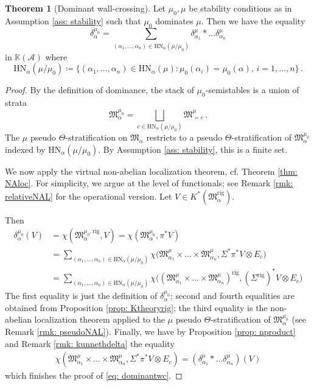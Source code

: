 \documentclass[12pt]{amsart}
\theoremstyle{definition}
\newtheorem{theorem}[definition]{Theorem}
\newcommand{\BK}{{\mathbb{K}}}
\newcommand{\CA}{{\mathcal A}}
\newcommand{\1}{\mathbf 1}
\newcommand{\FM}{{\mathfrak{M}}}
\newcommand{\rig}{\mathrm{rig}}
\newcommand{\HN}{\mathrm{HN}}
\begin{document}
\begin{theorem}[Dominant wall-crossing]\label{thm: dominantwc}
    Let $\mu_0, \mu$ be stability conditions as in Assumption \ref{ass: stability} such that $\mu_0$ dominates $\mu$. Then we have the equality
    \begin{equation}
        \label{eq: dominantwc}
    \delta_\alpha^{\mu_0}=\sum_{(\alpha_1, \ldots, \alpha_n)\in \HN_\alpha(\mu/\mu_0)}\delta_{\alpha_1}^{\mu}\ast\ldots \delta_{\alpha_n}^{\mu}\end{equation}
    in $\BK(\CA)$ where
    \begin{equation}\label{eq: HNmumu0}
        \HN_\alpha(\mu/\mu_0)\coloneqq \{(\alpha_1, \ldots, \alpha_n)\in \HN_\alpha(\mu)\colon \mu_0(\alpha_i)=\mu_0(\alpha),\, i=1, \ldots, n\}\,.
    \end{equation}
\end{theorem}
\begin{proof}
    By the definition of dominance, the stack of $\mu_0$-semistables is a union of strata
    \[\FM^{\mu_0}_\alpha=\bigsqcup_{c\in \HN_\alpha(\mu/\mu_0)}\FM^\mu_{=c}\,.\]
    The $\mu$ pseudo $\Theta$-stratification on $\FM_\alpha$ restricts to a pseudo $\Theta$-stratification of $\FM^{\mu_0}_\alpha$ indexed by $\HN_\alpha(\mu/\mu_0)$. By Assumption \ref{ass: stability}, this is a finite set. 

    We now apply the virtual non-abelian localization theorem, cf. Theorem \ref{thm: NAloc}. For simplicity, we argue at the level of functionals; see Remark \ref{rmk: relativeNAL} for the operational version. Let $V\in K^\ast(\FM_\alpha^\rig)$. 

    Then
    \begin{align*}
\delta_\alpha^{\mu_0}(V)&=\chi(\FM_{\alpha}^{\mu_0, \rig}, V)=\chi(\FM_{\alpha}^{\mu_0}, \pi^\ast V)\\
&=\sum_{(\alpha_1, \ldots, \alpha_n)\in \HN_\alpha(\mu/\mu_0)}\chi\big(\FM_{\alpha_1}^{\mu}\times \ldots \times \FM_{\alpha_n}^\mu,  \Sigma^\ast \pi^\ast V\otimes E_c\big)\\
&=\sum_{(\alpha_1, \ldots, \alpha_n)\in \HN_\alpha(\mu/\mu_0)}\chi\big((\FM_{\alpha_1}^{\mu}\times \ldots \times \FM_{\alpha_n}^\mu)^\rig,  (\Sigma^\rig)^\ast  V\otimes E_c\big)
    \end{align*}
The first equality is just the definition of $\delta_\alpha^{\mu_0}$; second and fourth equalities are obtained from Proposition \ref{prop: Ktheoryrig}; the third equality is the non-abelian localization theorem applied to the $\mu$ pseudo $\Theta$-stratification of $\FM_\alpha^{\mu_0}$ (see Remark \ref{rmk: pseudoNAL}). Finally, we have by Proposition \ref{prop: nproduct} and Remark \ref{rmk: kunnethdelta} the equality
    \begin{align*}
        \chi(\FM_{\alpha_1}^{\mu}\times \ldots \times \FM_{\alpha_n}^\mu,  \Sigma^\ast \pi^\ast V\otimes E_c)=(\delta_{\alpha_1}^\mu\ast\ldots \delta_{\alpha_n}^\mu)(V)
    \end{align*}
    which finishes the proof of \eqref{eq: dominantwc}.
\end{proof}
\end{document}
